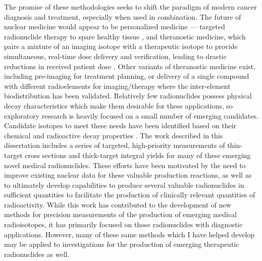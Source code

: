 The promise of these methodologies seeks to shift the paradigm of modern cancer diagnosis and treatment, especially when used in combination. 
The future of nuclear medicine would appear to be  personalized medicine --- targeted radionuclide therapy to spare healthy tissue \cite{Mulford2005,Qaim201731}, and theranostic medicine, which pairs a mixture of an imaging isotope with a therapeutic isotope to provide simultaneous, real-time dose delivery and verification, leading to drastic reductions in received patient dose \cite{Muller2014,Bentzen2005,Srivastava2012}. 
Other variants of theranostic medicine exist, including pre-imaging for treatment planning, or delivery of a single compound with different radioelements for imaging/therapy where the inter-element biodistribution has been validated.  
Relatively few radionuclides possess physical decay characteristics which make them desirable for these applications, so exploratory research is heavily focused on a small number of emerging candidates. Candidate isotopes to meet these needs have been identified based on their chemical and radioactive decay properties \cite{Qaim201731}. 
The work described in this dissertation
includes a series of 
targeted, high-priority measurements of thin-target cross sections and thick-target integral yields for many of these emerging novel medical radionuclides. 
These efforts have been motivated by the need to improve existing nuclear data for these valuable production reactions, as well as to ultimately develop capabilities to produce several valuable radionuclides in sufficient quantities to facilitate the production of clinically relevant quantities of radioactivity. 
While this work has contributed to the development of new methods for precision measurements of the production of emerging medical radioisotopes, it has primarily focused on those radionuclides with diagnostic applications. 
However, many of these same methods which I have helped develop may  be applied to  investigations for the production of emerging therapeutic radionuclides as well. 

